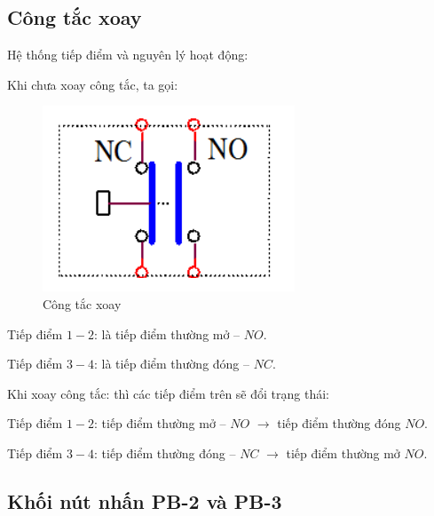 \documentclass[13pt,a4paper]{extarticle}
\begin{document}
\subsection{Công tắc xoay}
Hệ thống tiếp điểm và nguyên lý hoạt động:
\begin{list}{--}{}
\item Khi chưa xoay công tắc, ta gọi:\\
\begin{figure}[!h]
\begin{center}
\includegraphics[scale=.7]{nut-nhan-1}
\end{center}
\caption{Công tắc xoay}
\end{figure}
\begin{list}{+}{}
\item Tiếp điểm $1 - 2$: là tiếp điểm thường mở -- $NO$.
\item Tiếp điểm $3 - 4$: là tiếp điểm thường đóng -- $NC$.
\end{list}
\item Khi xoay công tắc: thì các tiếp điểm trên sẽ đổi trạng thái:
\item Tiếp điểm $1 - 2$: tiếp điểm thường mở -- $NO$ $\longrightarrow$ tiếp điểm thường đóng $NO$.
\item Tiếp điểm $3 - 4$: tiếp điểm thường đóng -- $NC$ $\longrightarrow$ tiếp điểm thường mở $NO$.
\end{list}
\newpage
\subsection{Khối nút nhấn PB-2 và PB-3}
\end{document}
